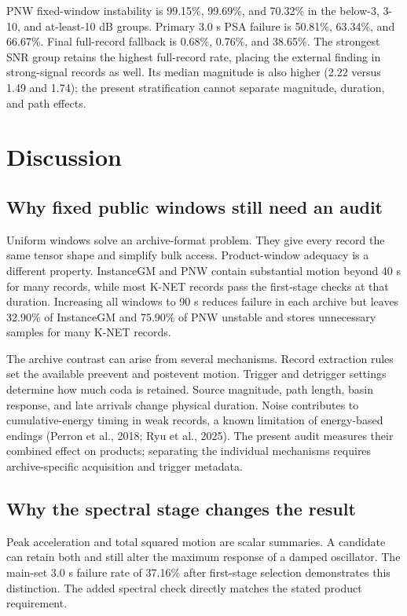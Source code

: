 \documentclass[12pt,letterpaper]{article}
\begin{document}
PNW fixed-window instability is 99.15\%, 99.69\%, and 70.32\% in the below-3, 3-10, and at-least-10 dB groups. Primary 3.0 s PSA failure is 50.81\%, 63.34\%, and 66.67\%. Final full-record fallback is 0.68\%, 0.76\%, and 38.65\%. The strongest SNR group retains the highest full-record rate, placing the external finding in strong-signal records as well. Its median magnitude is also higher (2.22 versus 1.49 and 1.74); the present stratification cannot separate magnitude, duration, and path effects.

\section{Discussion}\label{discussion}

\subsection{Why fixed public windows still need an audit}\label{why-fixed-public-windows-still-need-an-audit}

Uniform windows solve an archive-format problem. They give every record the same tensor shape and simplify bulk access. Product-window adequacy is a different property. InstanceGM and PNW contain substantial motion beyond 40 s for many records, while most K-NET records pass the first-stage checks at that duration. Increasing all windows to 90 s reduces failure in each archive but leaves 32.90\% of InstanceGM and 75.90\% of PNW unstable and stores unnecessary samples for many K-NET records.

The archive contrast can arise from several mechanisms. Record extraction rules set the available preevent and postevent motion. Trigger and detrigger settings determine how much coda is retained. Source magnitude, path length, basin response, and late arrivals change physical duration. Noise contributes to cumulative-energy timing in weak records, a known limitation of energy-based endings (Perron et al., 2018; Ryu et al., 2025). The present audit measures their combined effect on products; separating the individual mechanisms requires archive-specific acquisition and trigger metadata.

\subsection{Why the spectral stage changes the result}\label{why-the-spectral-stage-changes-the-result}

Peak acceleration and total squared motion are scalar summaries. A candidate can retain both and still alter the maximum response of a damped oscillator. The main-set 3.0 s failure rate of 37.16\% after first-stage selection demonstrates this distinction. The added spectral check directly matches the stated product requirement.
\end{document}
